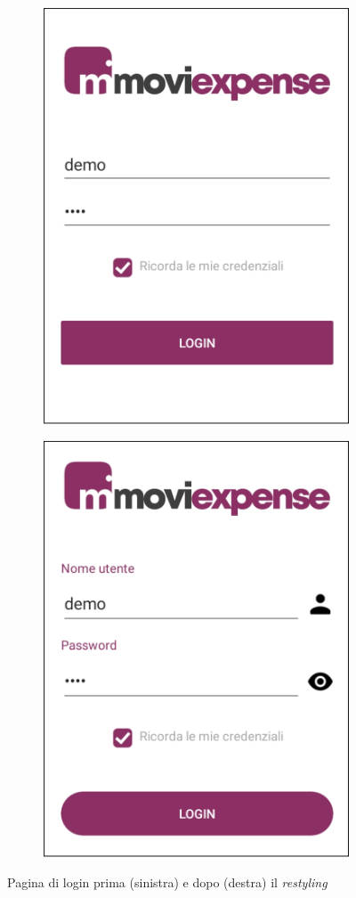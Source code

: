 \begin{figure}[H]
    \begin{subfigure}{.5\textwidth}
        \centering
        \includegraphics[width=.7\columnwidth]{images/screenshot/old/login.png}\vspace{2mm}
    \end{subfigure}
    \begin{subfigure}{.5\textwidth}
        \centering
        \includegraphics[width=.7\columnwidth]{images/screenshot/new/login.png}\vspace{2mm}
    \end{subfigure}
    \caption{Pagina di login prima (sinistra) e dopo (destra) il \emph{restyling}}
\end{figure}

